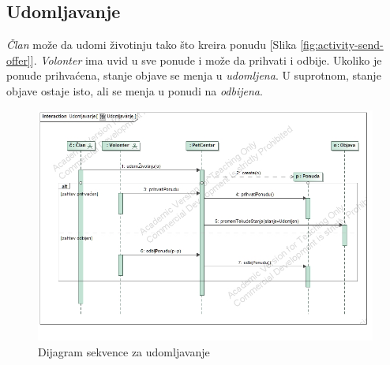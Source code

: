 \subsection{Udomljavanje}
\par \textit{Član} može da udomi životinju tako što kreira ponudu [Slika \ref{fig:activity-send-offer}]. \textit{Volonter} ima uvid u sve ponude i može da
prihvati i odbije. Ukoliko je ponude prihvaćena, stanje objave se menja u \textit{udomljena}. U suprotnom, stanje objave ostaje isto, ali se menja u 
ponudi na \textit{odbijena}.
\begin{figure}[ht]
    \centering
    \includegraphics[width=\textwidth, height=\textwidth]{img/adoption.jpg}
    \caption{Dijagram sekvence za udomljavanje}
    \label{fig:adoption-seq}
\end{figure}